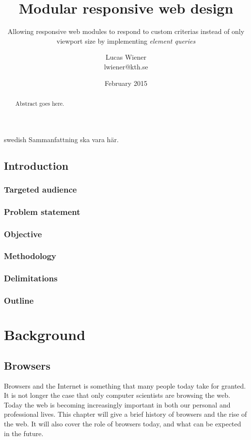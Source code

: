 \documentclass[a4paper,11pt]{kth-mag}
\title{Modular responsive web design}
\subtitle{Allowing responsive web modules to respond to custom criterias instead of only viewport size by implementing \emph{element queries}}
\author{Lucas Wiener \\ \lowercase{lwiener@kth.se}}
\date{February 2015}
\begin{document}
  \frontmatter
  \pagestyle{empty}
  \removepagenumbers
  \maketitle
  \begin{abstract}
    Abstract goes here.
  \end{abstract}
  \clearpage
  \begin{foreignabstract}{swedish}
    Sammanfattning ska vara här.
  \end{foreignabstract}
  \clearpage
  \tableofcontents*
  \mainmatter
  \pagestyle{newchap}
  \chapter{Introduction}
    \section{Targeted audience}
    \section{Problem statement}
    \section{Objective}
    \section{Methodology}
    \section{Delimitations}
    \section{Outline}
  \part{Background}

    \chapter{Browsers} 
      Browsers and the Internet is something that many people today take for granted.
      It is not longer the case that only computer scientists are browsing the web.
      Today the web is becoming increasingly important in both our personal and professional lives.
      This chapter will give a brief history of browsers and the rise of the web.
      It will also cover the role of browsers today, and what can be expected in the future. \cite{internetsociety_history_internet}
\end{document}
